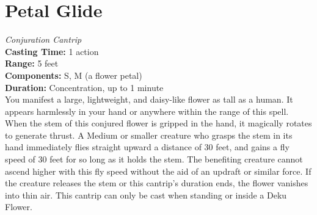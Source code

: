 \documentclass[10pt,twoside,twocolumn,openany]{book}
\begin{document}
\section{Petal Glide}
\textit{Conjuration Cantrip} \\

\noindent \textbf{Casting Time:} 1 action\\
\textbf{Range:} 5 feet\\
\textbf{Components:} S, M (a flower petal)\\
\textbf{Duration:} Concentration, up to 1 minute\\

\noindent You manifest a large, lightweight, and daisy-like flower as tall as a human. It appears harmlessly in your hand or anywhere within the range of this spell. When the stem of this conjured flower is gripped in the hand, it magically rotates to generate thrust. A Medium or smaller creature who grasps the stem in its hand immediately flies straight upward a distance of 30 feet, and gains a fly speed of 30 feet for so long as it holds the stem. The benefiting creature cannot ascend higher with this fly speed without the aid of an updraft or similar force. If the creature releases the stem or this cantrip's duration ends, the flower vanishes into thin air. This cantrip can only be cast when standing or inside a Deku Flower. \\





\end{document}
